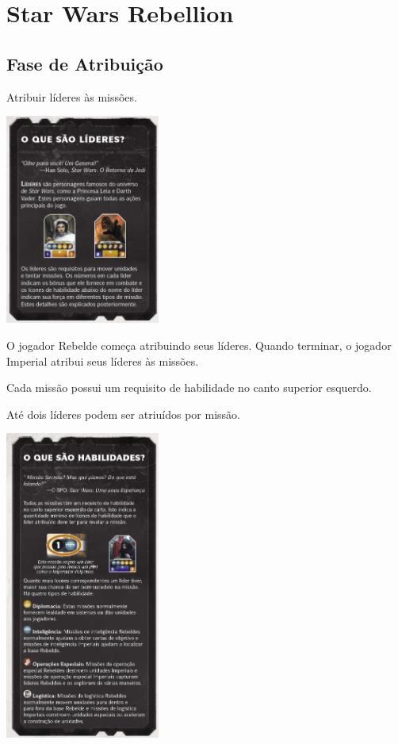 \documentclass[11pt]{article}
\author{Fabio Favero Henkes}
\date{\today}
\title{}
\begin{document}
\tableofcontents


\section{Star Wars Rebellion}
\label{sec:orge35a6f3}

\subsection{Fase de Atribuição}
\label{sec:org9fb58df}

Atribuir líderes às missões.

\begin{center}
\includegraphics[width=2.0in]{./lider.png}
\end{center}

O jogador Rebelde começa atribuindo seus líderes. Quando terminar, o jogador Imperial atribui seus líderes às missões.

Cada missão possui um requisito de habilidade no canto superior esquerdo.

Até dois líderes podem ser atriuídos por missão.

\begin{center}
\includegraphics[width=2.0in]{./skills.png}
\end{center}
\end{document}
